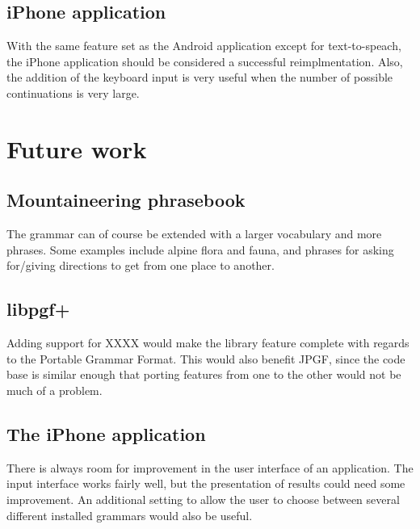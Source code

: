 \subsection{iPhone application}
With the same feature set as the Android application except for text-to-speach, the iPhone application should be considered a successful reimplmentation. Also, the addition of the keyboard input is very useful when the number of possible continuations is very large.


\section{Future work}


\subsection{Mountaineering phrasebook}
The grammar can of course be extended with a larger vocabulary and more phrases. Some examples include alpine flora and fauna, and phrases for asking for/giving directions to get from one place to another.


\subsection{libpgf+}
Adding support for XXXX would make the library feature complete with regards to the Portable Grammar Format. This would also benefit JPGF, since the code base is similar enough that porting features from one to the other would not be much of a problem.


\subsection{The iPhone application}
There is always room for improvement in the user interface of an application. The input interface works fairly well, but the presentation of results could need some improvement. An additional setting to allow the user to choose between several different installed grammars would also be useful.
